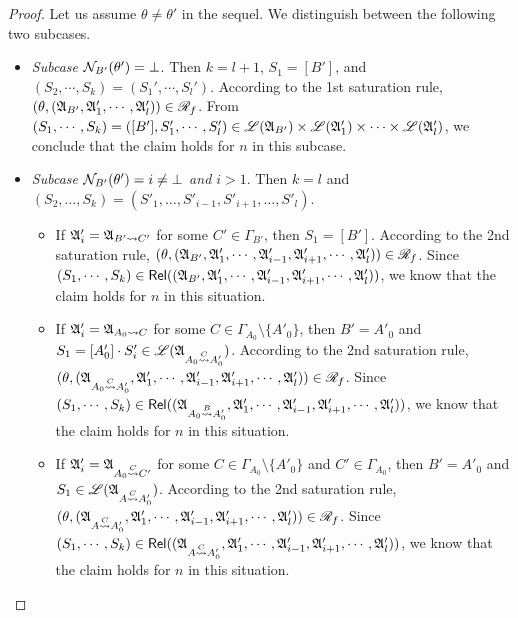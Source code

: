 \begin{proof}
Let us assume $\theta \neq \theta'$ in the sequel. We distinguish between the following two subcases. 
\begin{itemize}
    \item \emph{Subcase $\mathcal{N}_{B'}(\theta') = \bot$}. Then $k=l+1$, $S_1=[B']$, and $(S_2,\cdots,S_k)=(S_1',\cdots,S_l')$.  According to the 1st saturation rule, $(\theta, ({\mathfrak{A} }_{B'}, {\mathfrak{A} }_1', \cdots, {\mathfrak{A} }_l')) \in \mathscr{R}_f$.
   From $(S_1, \cdots, S_k) = ([B'], S_1', \cdots, S_l') \in {\mathscr{L} }({\mathfrak{A} }_{B'}) \times {\mathscr{L} }({\mathfrak{A} }_1') \times \cdots \times {\mathscr{L} }({\mathfrak{A} }_l')$, we conclude that the claim holds for $n$ in this subcase.
    \item \emph{Subcase $\mathcal{N}_{B'}(\theta') = i \neq \bot$ and $i > 1$}. Then $k = l$ and $(S_2, \dots, S_k) = (S'_1, \dots, S'_{i-1}, S'_{i+1}, \dots, S'_l)$. 
\begin{itemize}
\item If ${\mathfrak{A} }'_i = {\mathfrak{A} }_{B' \rightsquigarrow C'}$ for some $C' \in \Gamma_{B'}$, then $S_1 = [B']$. According to the 2nd saturation rule, $(\theta, ({\mathfrak{A} }_{B'}, {\mathfrak{A} }'_1, \cdots, {\mathfrak{A} }'_{i-1}, {\mathfrak{A} }'_{i+1}, \cdots, {\mathfrak{A} }'_l)) \in \mathscr{R}_f$. Since $(S_1, \cdots, S_k) \in \mathsf{Rel}(({\mathfrak{A} }_{B'}, {\mathfrak{A} }'_1, \cdots, {\mathfrak{A} }'_{i-1}, {\mathfrak{A} }'_{i+1}, \cdots, {\mathfrak{A} }'_l))$, we know that the claim holds for $n$ in this situation.
%
\item If ${\mathfrak{A} }'_i = {\mathfrak{A} }_{A_0 \rightsquigarrow C}$ for some $C \in \Gamma_{A_0} \setminus \{A'_0\}$, then $B' = A'_0$ and $S_1 = [A'_0] \cdot S'_i \in {\mathscr{L} }({\mathfrak{A} }_{A_0 \stackrel{C}{\rightsquigarrow} A'_0})$.  According to the 2nd saturation rule, $(\theta, ({\mathfrak{A} }_{A_0 \stackrel{C}{\rightsquigarrow} A'_0}, {\mathfrak{A} }'_1, \cdots, {\mathfrak{A} }'_{i-1}, {\mathfrak{A} }'_{i+1}, \cdots, {\mathfrak{A} }'_l)) \in \mathscr{R}_f$. Since $(S_1, \cdots, S_k) \in \mathsf{Rel}(({\mathfrak{A} }_{A_0 \stackrel{B}{\rightsquigarrow} A'_0}, {\mathfrak{A} }'_1, \cdots, {\mathfrak{A} }'_{i-1}, {\mathfrak{A} }'_{i+1}, \cdots, {\mathfrak{A} }'_l))$, we know that the claim holds for $n$ in this situation.

%
\item If ${\mathfrak{A} }'_i = {\mathfrak{A} }_{A_0 \stackrel{C}{\rightsquigarrow} C'}$ for some $C \in \Gamma_{A_0} \setminus \{A'_0\}$ and $C' \in \Gamma_{A_0}$, then $B' = A'_0$ and $S_1 \in  {\mathscr{L} }({\mathfrak{A} }_{A \stackrel{C}{\rightsquigarrow} A'_0})$.  According to the 2nd saturation rule, $(\theta, ({\mathfrak{A} }_{A \stackrel{C}{\rightsquigarrow} A'_0}, {\mathfrak{A} }'_1, \cdots, {\mathfrak{A} }'_{i-1}, {\mathfrak{A} }'_{i+1}, \cdots, {\mathfrak{A} }'_l)) \in \mathscr{R}_f$. Since $(S_1, \cdots, S_k) \in \mathsf{Rel}(({\mathfrak{A} }_{A \stackrel{C}{\rightsquigarrow} A'_0}, {\mathfrak{A} }'_1, \cdots, {\mathfrak{A} }'_{i-1}, {\mathfrak{A} }'_{i+1}, \cdots, {\mathfrak{A} }'_l))$, we know that the claim holds for $n$ in this situation.
\end{itemize}
\end{itemize}
 

\end{proof}
